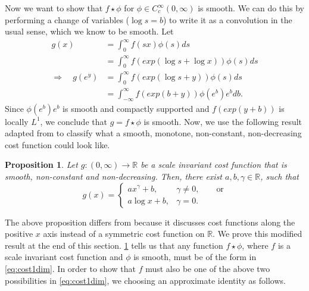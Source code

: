 \documentclass{article}
\newtheorem{proposition}{Proposition}
\newcommand{\R}{\mathbb{R}}
\begin{document}
Now we want to show that $f\star\phi$ for $\phi\in
C^\infty_c(0,\infty)$ is smooth. We can do this by performing a change
of variables ($\log s=b$)
to write it as a convolution in the usual sense, which we know to be
smooth. Let
\begin{align*}
  g(x) & = \int_0^\infty f(sx) \phi(s)ds\nonumber \\
       & =  \int_0^\infty f(exp(\log s+\log x)) \phi(s)ds\nonumber \\
\Rightarrow \quad g(e^y) & =   \int_0^\infty f(exp(\log s+y)) \phi(s)ds\nonumber \\
  & = \int_{-\infty}^\infty f(exp(b + y))\phi(e^b) e^b db. \nonumber
\end{align*}
Since $ \phi(e^b) e^b$ is smooth and compactly supported and
$f(exp(y+b))$ is locally $L^1$, we conclude that $g=f\star\phi$ is smooth.
Now, we use the following result adapted
from  \cite[Proposition 18]{minimal} to classify what a smooth,
monotone, non-constant, non-decreasing cost function could look like.

\begin{proposition}\label{scinvfrommin}
  Let $g:(0,\infty)\rightarrow\R$ be a scale invariant cost function that is smooth,
  non-constant and non-decreasing. Then,
   there exist
$a,b,\gamma\in\mathbb{R}$, such that
\begin{equation}\label{eq:cost1dim}
  g(x) =
  \begin{cases}
    ax^\gamma +b, & \gamma\neq 0, \qquad \mbox{or} \\
    a\log x + b, & \gamma=0.
  \end{cases}
\end{equation}
\end{proposition}
The above proposition differs from \cite[Proposition 18]{minimal}
because it discusses cost functions along the positive $x$ axis instead of a symmetric
cost function on $\R$. We prove this modified result at the end of
this section.
\cref{scinvfrommin} tells us that any function
$f\star \phi$, where $f$ is a scale invariant cost function and $\phi$
is smooth, must be of the form in \eqref{eq:cost1dim}.
In order to show that $f$ must also be one of the above two
possibilities in \eqref{eq:cost1dim}, we choosing an
approximate identity as follows.
\end{document}

